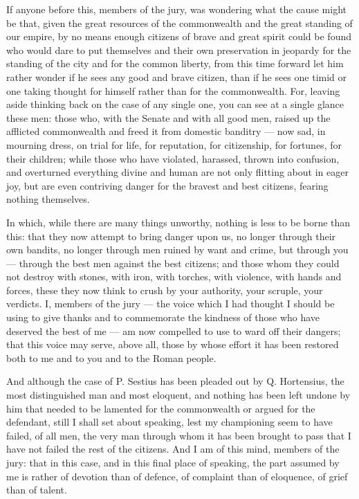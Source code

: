 
 If anyone before this, members of the jury, was wondering what the cause might be that, given the great resources of the commonwealth and the great standing of our empire, by no means enough citizens of brave and great spirit could be found who would dare to put themselves and their own preservation in jeopardy for the standing of the city and for the common liberty, from this time forward let him rather wonder if he sees any good and brave citizen, than if he sees one timid or one taking thought for himself rather than for the commonwealth. For, leaving aside thinking back on the case of any single one, you can see at a single glance these men: those who, with the Senate and with all good men, raised up the afflicted commonwealth and freed it from domestic banditry --- now sad, in mourning dress, on trial for life, for reputation, for citizenship, for fortunes, for their children; while those who have violated, harassed, thrown into confusion, and overturned everything divine and human are not only flitting about in eager joy, but are even contriving danger for the bravest and best citizens, fearing nothing themselves.

 In which, while there are many things unworthy, nothing is less to be borne than this: that they now attempt to bring danger upon us, no longer through their own bandits, no longer through men ruined by want and crime, but through you --- through the best men against the best citizens; and those whom they could not destroy with stones, with iron, with torches, with violence, with hands and forces, these they now think to crush by your authority, your scruple, your verdicts. I, members of the jury --- the voice which I had thought I should be using to give thanks and to commemorate the kindness of those who have deserved the best of me --- am now compelled to use to ward off their dangers; that this voice may serve, above all, those by whose effort it has been restored both to me and to you and to the Roman people.

 And although the case of P. Sestius has been pleaded out by Q. Hortensius, the most distinguished man and most eloquent, and nothing has been left undone by him that needed to be lamented for the commonwealth or argued for the defendant, still I shall set about speaking, lest my championing seem to have failed, of all men, the very man through whom it has been brought to pass that I have not failed the rest of the citizens. And I am of this mind, members of the jury: that in this case, and in this final place of speaking, the part assumed by me is rather of devotion than of defence, of complaint than of eloquence, of grief than of talent.

